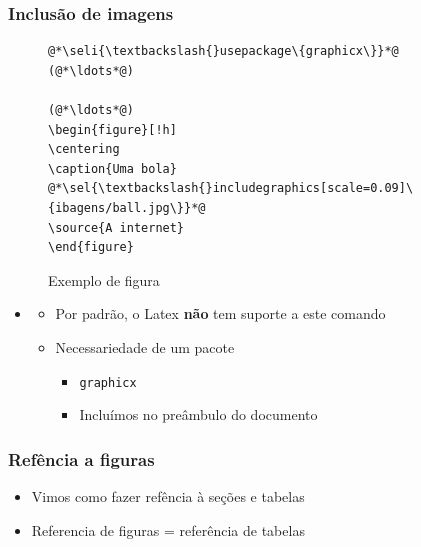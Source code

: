 \begin{frame}[fragile] \frametitle{Inclusão de imagens}
\vspace{-0.5cm}
\begin{figure}[!t]
\caption{Exemplo de figura}
\begin{lstlisting}
@*\seli{\textbackslash{}usepackage\{graphicx\}}*@
(@*\ldots*@)

(@*\ldots*@)
\begin{figure}[!h]
\centering
\caption{Uma bola}
@*\sel{\textbackslash{}includegraphics[scale=0.09]\{ibagens/ball.jpg\}}*@
\source{A internet}
\end{figure}
\end{lstlisting}
\ownsrc
\end{figure}

\begin{itemize}
	\item {}
	\begin{itemize}
		\item Por padrão, o Latex \textbf{não} tem suporte a este comando
		\item Necessariedade de um pacote
		\begin{itemize}
			\item \texttt{graphicx}
			\item Incluímos no preâmbulo do documento 
		\end{itemize}
	\end{itemize}
\end{itemize}
\end{frame}

\begin{frame}[fragile] \frametitle{Refência a figuras}

\begin{itemize}
	\item Vimos como fazer refência à seções e tabelas
	\item Referencia de figuras = referência de tabelas
\end{itemize}

\end{frame}


